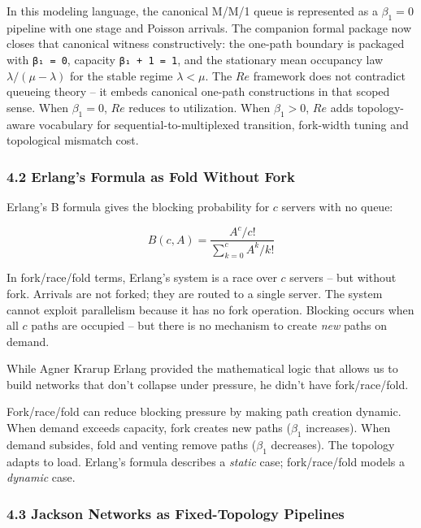 \documentclass[
  11pt,
]{article}
\begin{document}
In this modeling language, the canonical M/M/1 queue is represented as a
\(\beta_1 = 0\) pipeline with one stage and Poisson arrivals. The
companion formal package now closes that canonical witness
constructively: the one-path boundary is packaged with
\texttt{β₁\ =\ 0}, capacity \texttt{β₁\ +\ 1\ =\ 1}, and the stationary
mean occupancy law \(\lambda / (\mu - \lambda)\) for the stable regime
\(\lambda < \mu\). The \(Re\) framework does not contradict queueing
theory -- it embeds canonical one-path constructions in that scoped
sense. When \(\beta_1 = 0\), \(Re\) reduces to utilization. When
\(\beta_1 > 0\), \(Re\) adds topology-aware vocabulary for
sequential-to-multiplexed transition, fork-width tuning and topological
mismatch cost.

\subsubsection{4.2 Erlang's Formula as Fold Without
Fork}\label{erlangs-formula-as-fold-without-fork}

Erlang's B formula gives the blocking probability for \(c\) servers with
no queue:

\[
B(c, A) = \frac{A^c / c!}{\sum_{k=0}^{c} A^k / k!}
\]

In fork/race/fold terms, Erlang's system is a race over \(c\) servers --
but without fork. Arrivals are not forked; they are routed to a single
server. The system cannot exploit parallelism because it has no fork
operation. Blocking occurs when all \(c\) paths are occupied -- but
there is no mechanism to create \emph{new} paths on demand.

While Agner Krarup Erlang provided the mathematical logic that allows us
to build networks that don't collapse under pressure, he didn't have
fork/race/fold.

Fork/race/fold can reduce blocking pressure by making path creation
dynamic. When demand exceeds capacity, fork creates new paths
(\(\beta_1\) increases). When demand subsides, fold and venting remove
paths (\(\beta_1\) decreases). The topology adapts to load. Erlang's
formula describes a \emph{static} case; fork/race/fold models a
\emph{dynamic} case.

\subsubsection{4.3 Jackson Networks as Fixed-Topology
Pipelines}\label{jackson-networks-as-fixed-topology-pipelines}
\end{document}
